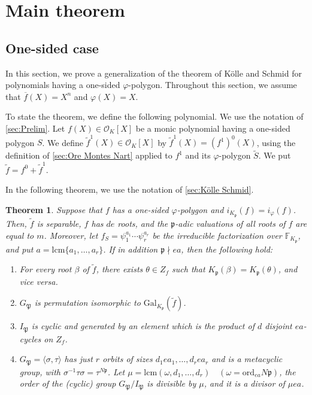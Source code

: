 \documentclass{article}
\newcommand{\field}[1]{\mathbb{#1}}
\newcommand{\Gal}{\mathrm{Gal}}
\newtheorem{theorem}{Theorem}[section]
\theoremstyle{definition}
\theoremstyle{remark}
\numberwithin{equation}{section}
\begin{document}
\section{Main theorem}\label{sec:Main theorem}

  \subsection{One-sided case}\label{sec:One-sided}

  In this section, we prove a generalization of the theorem of Kölle and Schmid for polynomials having a one-sided $\varphi$-polygon. 
  Throughout this section, we assume that $\overline{f}(X) = X^n$ and $\varphi(X) = X$. 

  To state the theorem, we define the following polynomial. 
  We use the notation of \cref{sec:Prelim}. 
  Let $f(X) \in \mathcal{O}_K[X]$ be a monic polynomial having a one-sided polygon $S$. 
  We define $\tilde{f}^1(X) \in \mathcal{O}_K[X]$ by $\tilde{f}^1(X) = (f^1)^0(X)$, 
  using the definition of \cref{sec:Ore Montes Nart} applied to $f^1$ and its $\varphi$-polygon $\tilde{S}$. 
  We put $\tilde{f}=f^0 + \tilde{f}^1$. 

  In the following theorem, we use the notation of \cref{sec:Kölle Schmid}. 

  \begin{theorem}\label{thm:our main theorem}
      Suppose that $f$ has a one-sided $\varphi$-polygon and $i_{K_{\mathfrak{p}}}(f) = i_{\varphi}(f)$. 
      Then, $\tilde{f}$ is separable, $f$ has $de$ roots, and the $\mathfrak{p}$-adic valuations of all roots of $f$ are equal to $m$. 
      Moreover, let $f_S = \psi_1^{a_1} \cdots \psi_r^{a_r}$ be the irreducible factorization over $\field{F}_{K_{\mathfrak{p}}}$, 
      and put $a = \mathrm{lcm}\{a_1, \dots ,a_r\}$. 
      If in addition $\mathfrak{p} \nmid ea$, then the following hold:
      \begin{enumerate}
        \item For every root $\beta$ of $\tilde{f}$, there exists $\theta \in Z_f$ such that $K_{\mathfrak{p}}(\beta) = K_{\mathfrak{p}}(\theta)$, and vice versa. 
        \item $G_{\mathfrak{P}}$ is permutation isomorphic to $\Gal_{K_\mathfrak{p}}(\tilde{f})$. 
        \item $I_{\mathfrak{P}}$ is cyclic and generated by an element which is the product of $d$ disjoint $ea$-cycles on $Z_f$. 
        \item $G_{\mathfrak{P}} = \langle \sigma,\tau \rangle$ has just $r$ orbits of sizes $d_1 ea_1, \dots ,d_r ea_r$ 
          and is a metacyclic group, with $\sigma^{-1}\tau\sigma = \tau^{N\mathfrak{p}}$. 
          Let $\mu = \mathrm{lcm}(\omega,d_1, \dots ,d_r) \quad (\omega = \mathrm{ord}_{ea} N\mathfrak{p})$, the order of the (cyclic) group $G_{\mathfrak{P}}/I_{\mathfrak{P}}$ 
          is divisible by $\mu$, and it is a divisor of $\mu ea$. 
      \end{enumerate}
    \end{theorem}
\end{document}
